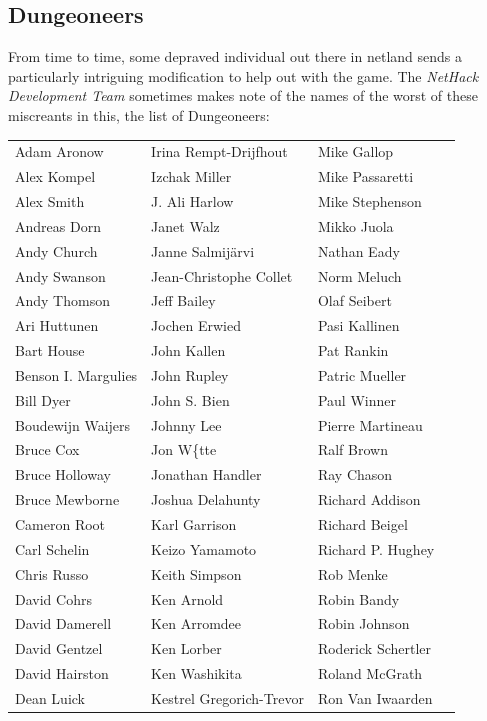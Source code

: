 \documentclass[titlepage]{article}
\begin{document}
\subsection*{Dungeoneers}
\noindent From time to time, some depraved individual out there in netland sends a
particularly intriguing modification to help out with the game.  The
\textit{NetHack Development Team} sometimes makes note of the names of the worst
of these miscreants in this, the list of Dungeoneers:
\medskip
\begin{center}
\begin{tabular}{llll}
Adam Aronow & Irina Rempt-Drijfhout & Mike Gallop\\
Alex Kompel & Izchak Miller & Mike Passaretti\\
Alex Smith & J. Ali Harlow & Mike Stephenson\\
Andreas Dorn & Janet Walz & Mikko Juola\\
Andy Church & Janne Salmij\"{a}rvi & Nathan Eady\\
Andy Swanson & Jean-Christophe Collet & Norm Meluch\\
Andy Thomson & Jeff Bailey & Olaf Seibert\\
Ari Huttunen & Jochen Erwied & Pasi Kallinen\\
Bart House & John Kallen & Pat Rankin\\
Benson I. Margulies & John Rupley & Patric Mueller\\
Bill Dyer & John S. Bien & Paul Winner\\
Boudewijn Waijers & Johnny Lee & Pierre Martineau\\
Bruce Cox & Jon W\{tte & Ralf Brown\\
Bruce Holloway & Jonathan Handler & Ray Chason\\
Bruce Mewborne & Joshua Delahunty & Richard Addison\\
Cameron Root & Karl Garrison & Richard Beigel\\
Carl Schelin & Keizo Yamamoto & Richard P. Hughey\\
Chris Russo & Keith Simpson & Rob Menke\\
David Cohrs & Ken Arnold & Robin Bandy\\
David Damerell & Ken Arromdee & Robin Johnson\\
David Gentzel & Ken Lorber & Roderick Schertler\\
David Hairston & Ken Washikita & Roland McGrath\\
Dean Luick & Kestrel Gregorich-Trevor & Ron Van Iwaarden\\

\end{tabular}
\end{center}
\end{document}
